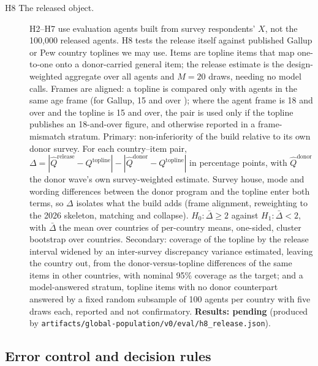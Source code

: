 \documentclass[10pt]{article}
\newcommand{\pending}[1]{\textbf{Results: pending} (produced by \nolinkurl{#1})}
\begin{document}
\begin{description}
  \item[H8 The released object.] H2--H7 use evaluation agents built from survey respondents' $X$, not the 100,000 released agents. H8 tests the release itself against published Gallup or Pew country toplines we may use. Items are topline items that map one-to-one onto a donor-carried general item; the release estimate is the design-weighted aggregate over all agents and $M=20$ draws, needing no model calls. Frames are aligned: a topline is compared only with agents in the same age frame (for Gallup, 15 and over \citep{gallupwp}); where the agent frame is 18 and over and the topline is 15 and over, the pair is used only if the topline publishes an 18-and-over figure, and otherwise reported in a frame-mismatch stratum. Primary: non-inferiority of the build relative to its own donor survey. For each country--item pair, $\Delta = |\hat Q^{\text{release}} - Q^{\text{topline}}| - |\hat Q^{\text{donor}} - Q^{\text{topline}}|$ in percentage points, with $\hat Q^{\text{donor}}$ the donor wave's own survey-weighted estimate. Survey house, mode and wording differences between the donor program and the topline enter both terms, so $\Delta$ isolates what the build adds (frame alignment, reweighting to the 2026 skeleton, matching and collapse). $H_0\!: \bar\Delta \ge 2$ against $H_1\!: \bar\Delta < 2$, with $\bar\Delta$ the mean over countries of per-country means, one-sided, cluster bootstrap over countries. Secondary: coverage of the topline by the release interval widened by an inter-survey discrepancy variance estimated, leaving the country out, from the donor-versus-topline differences of the same items in other countries, with nominal 95\% coverage as the target; and a model-answered stratum, topline items with no donor counterpart answered by a fixed random subsample of 100 agents per country with five draws each, reported and not confirmatory. \pending{artifacts/global-population/v0/eval/h8_release.json}.
\end{description}

\subsection{Error control and decision rules}
\end{document}
